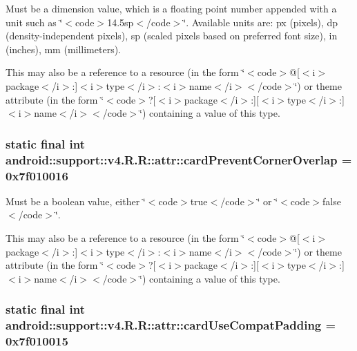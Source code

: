 Must be a dimension value, which is a floating point number appended with a unit such as \char`\"{}$<$code$>$14.5sp$<$/code$>$\char`\"{}. Available units are: px (pixels), dp (density-independent pixels), sp (scaled pixels based on preferred font size), in (inches), mm (millimeters). 

This may also be a reference to a resource (in the form \char`\"{}$<$code$>$@\mbox{[}$<$i$>$package$<$/i$>$:\mbox{]}$<$i$>$type$<$/i$>$:$<$i$>$name$<$/i$>$$<$/code$>$\char`\"{}) or theme attribute (in the form \char`\"{}$<$code$>$?\mbox{[}$<$i$>$package$<$/i$>$:\mbox{]}\mbox{[}$<$i$>$type$<$/i$>$:\mbox{]}$<$i$>$name$<$/i$>$$<$/code$>$\char`\"{}) containing a value of this type. \hypertarget{classandroid_1_1support_1_1v4_1_1_r_1_1attr_056ac83099f50b4a87340751155d3020}{
\subsubsection[{cardPreventCornerOverlap}]{\setlength{\rightskip}{0pt plus 5cm}static final int android::support::v4.R.R::attr::cardPreventCornerOverlap = 0x7f010016}}
\label{classandroid_1_1support_1_1v4_1_1_r_1_1attr_056ac83099f50b4a87340751155d3020}


Must be a boolean value, either \char`\"{}$<$code$>$true$<$/code$>$\char`\"{} or \char`\"{}$<$code$>$false$<$/code$>$\char`\"{}. 

This may also be a reference to a resource (in the form \char`\"{}$<$code$>$@\mbox{[}$<$i$>$package$<$/i$>$:\mbox{]}$<$i$>$type$<$/i$>$:$<$i$>$name$<$/i$>$$<$/code$>$\char`\"{}) or theme attribute (in the form \char`\"{}$<$code$>$?\mbox{[}$<$i$>$package$<$/i$>$:\mbox{]}\mbox{[}$<$i$>$type$<$/i$>$:\mbox{]}$<$i$>$name$<$/i$>$$<$/code$>$\char`\"{}) containing a value of this type. \hypertarget{classandroid_1_1support_1_1v4_1_1_r_1_1attr_33e2ba021284f6062c76a9722d1a22b3}{
\subsubsection[{cardUseCompatPadding}]{\setlength{\rightskip}{0pt plus 5cm}static final int android::support::v4.R.R::attr::cardUseCompatPadding = 0x7f010015}}
\label{classandroid_1_1support_1_1v4_1_1_r_1_1attr_33e2ba021284f6062c76a9722d1a22b3}



